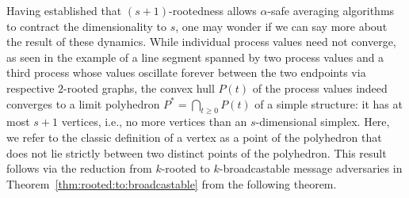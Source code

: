 \documentclass[preprint,12pt,a4paper]{elsarticle}
\theoremstyle{plain}
\theoremstyle{definition}
\renewcommand{\geq}{\geqslant}
\begin{document}
Having established that $(s + 1)$-rootedness allows $\alpha$-safe averaging
  algorithms to contract the dimensionality to $s$, one may wonder if we can
  say more about the result of these dynamics.
While individual process values need not converge, as seen in the example of a line segment
  spanned by two process values and a third process whose values oscillate forever
  between the two endpoints via respective $2$-rooted graphs,
  the convex hull $P(t)$ of the process values indeed converges to a
  limit polyhedron $P^* = \bigcap_{t \geq 0} P(t)$ of a simple structure:
  it has at most $s+1$ vertices, i.e.,
  no more vertices than an $s$-dimensional simplex.
Here, we refer to the classic definition of a vertex as a point of the
  polyhedron that does not lie strictly between two distinct points
  of the polyhedron.
This result follows via the reduction from $k$-rooted to
  $k$-broadcastable message adversaries in
  Theorem~\ref{thm:rooted:to:broadcastable} from the following theorem.
\end{document}
